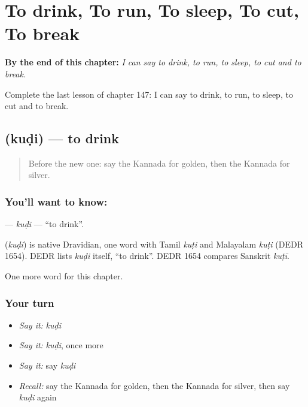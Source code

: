 
\chapter{To drink, To run, To sleep, To cut, To break}
\label{ch:ka-to-drink-to-run-to-sleep-to-cut-to-break}

\begin{chapteropening}
\textbf{By the end of this chapter:} \emph{I can say to drink, to run, to sleep, to cut and to break.}

Complete the last lesson of chapter 147: I can say to drink, to run, to sleep, to cut and to break.
\end{chapteropening}

\section[\texorpdfstring{\kn{ಕುಡಿ} (kuḍi)}{ಕುಡಿ (kuḍi)}]{ (kuḍi) — to drink}

\label{lesson:KA-C147-kudi}



\begin{quote}
Before the new one: say the Kannada for golden, then the Kannada for silver.
\end{quote}

\subsection*{You'll want to know: }
\textbf{} — \emph{kuḍi} — \textquotedblleft{}to drink\textquotedblright{}.

\begin{cousinweb}
\textbf{} (\emph{kuḍi}) is native Dravidian, one word with Tamil \emph{kuṭi} and Malayalam \emph{kuṭi} (DEDR 1654). DEDR lists \emph{kuḍi} itself, \textquotedblleft{}to drink\textquotedblright{}. DEDR 1654 compares Sanskrit \emph{kuṭī}.
\end{cousinweb}

\begin{grammarlens}[title={What you've built}]
One more word for this chapter.
\end{grammarlens}

\subsection*{Your turn}
\begin{itemize}
\raggedright
  \item \emph{Say it:} \emph{kuḍi}
  \item \emph{Say it:} \emph{kuḍi}, once more
  \item \emph{Say it:} say \emph{kuḍi}
  \item \emph{Recall:} say the Kannada for golden, then the Kannada for silver, then say \emph{kuḍi} again
\end{itemize}

